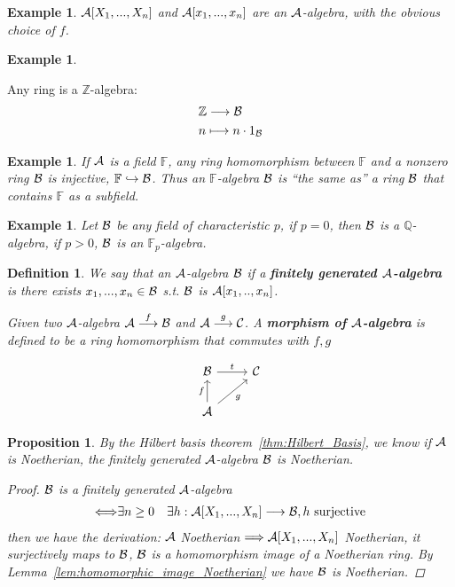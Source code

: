 \documentclass[11pt]{article}
\newtheorem{prop}[thm]{Proposition}
\newtheorem{dfn}[thm]{Definition}
\newtheorem{ex}[thm]{Example}
\newcommand{\intg}{\mathbb Z}
\newcommand{\bbf}{\mathbb F}
\newcommand{\ratl}{\mathbb Q}
\newcommand{\cala}{{\cal A}}
\newcommand{\calb}{{\cal B}}
\newcommand{\calc}{{\cal C}}
\newcommand{\Lrta}{\Longrightarrow}
\newcommand{\lrta}{\longrightarrow}
\newcommand{\Llrta}{\Longleftrightarrow}
\newcommand{\inj}{\hookrightarrow}
\begin{document}
\begin{ex}
$\cala[X_1,...,X_n]$ and $\cala[x_1,...,x_n]$ are an $\cala$-algebra, with the obvious choice of $f$.
\end{ex}
\begin{ex}

\end{ex}Any ring is a $\intg$-algebra:
$$
\begin{aligned}
&\intg \lrta \calb\\
&n\longmapsto n \cdot 1_\calb
\end{aligned}
$$
\begin{ex}
If $\cala$ is a field $\bbf$, any ring homomorphism between $\bbf$ and a nonzero ring $\calb$ is injective, $\bbf\inj \calb$. Thus an $\bbf$-algebra $\calb$ is ``the same as'' a ring $\calb$ that contains $\bbf$ as a subfield.
\end{ex}

\begin{ex}
Let $\calb$ be any field of characteristic $p$, if $p=0$, then $\calb$ is a $\ratl$-algebra, if $p>0$, $\calb$ is an $\bbf_p$-algebra.
\end{ex}

\begin{dfn}
We say that an $\cala$-algebra $\calb$ if a \textbf{finitely generated $\cala$-algebra} is there exists $x_1,...,x_n\in \calb$ s.t. $\calb$ is $\cala[x_1,..,x_n]$. 

Given two $\cala$-algebra $\cala\overset{f}{\lrta}\calb$ and $\cala\overset{g}{\lrta}\calc$. A \textbf{morphism of $\cala$-algebra} is defined to be a ring homomorphism that commutes with $f,g$

\[
\begin{tikzcd}
\calb\ar[r, "t"]&\calc\\
\cala \ar[u, "f"]\ar[ur,swap, "g"] 
\end{tikzcd}
\] 
\end{dfn}

\begin{prop}
By the Hilbert basis theorem~\ref{thm:Hilbert_Basis}, we know if $\cala$ is Noetherian, the finitely generated $\cala$-algebra $\calb$ is Noetherian.
\begin{proof}
$\calb$ is a finitely generated $\cala$-algebra\\
$$
\begin{aligned}
\Llrta &\exists n\geq 0
& \exists h:\cala[X_1,...,X_n]\lrta \calb, h\text{ surjective}
\end{aligned}
$$
then we have the derivation: $\cala$ Noetherian $\Lrta \cala[X_1,...,X_n]$ Noetherian, it surjectively maps to $\calb$, $\calb$ is a homomorphism image of a Noetherian ring. By Lemma~\ref{lem:homomorphic_image_Noetherian} we have $\calb$ is Noetherian.
\end{proof}
\end{prop}
\end{document}
